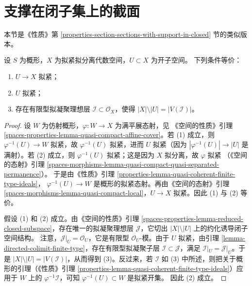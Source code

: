 \section{支撑在闭子集上的截面}
\label{section-sections-with-support-in-closed}

\noindent
本节是《性质》第
\ref{properties-section-sections-with-support-in-closed} 节的类似版本。

\begin{lemma}
\label{lemma-quasi-coherent-finite-type-ideals}
设 $S$ 为概形，$X$ 为拟紧拟分离代数空间，$U \subset X$ 为开子空间。
下列条件等价：
\begin{enumerate}
\item $U \to X$ 拟紧；
\item $U$ 拟紧；
\item 存在有限型拟凝聚理想层
$\mathcal{I} \subset \mathcal{O}_X$，使得
$|X| \setminus |U| = |V(\mathcal{I})|$。
\end{enumerate}
\end{lemma}

\begin{proof}
设 $W$ 为仿射概形，$\varphi : W \to X$ 为满平展态射，见
《空间的性质》引理
\ref{spaces-properties-lemma-quasi-compact-affine-cover}。若 (1) 成立，则
$\varphi^{-1}(U) \to W$ 拟紧，故 $\varphi^{-1}(U)$ 拟紧，进而 $U$
拟紧（因为 $|\varphi^{-1}(U)| \to |U|$ 是满射）。若 (2) 成立，则
$\varphi^{-1}(U)$ 拟紧；这是因为 $X$ 拟分离，故 $\varphi$ 拟紧
（《空间的态射》引理
\ref{spaces-morphisms-lemma-quasi-compact-quasi-separated-permanence}）。
于是由《性质》引理
\ref{properties-lemma-quasi-coherent-finite-type-ideals}，
$\varphi^{-1}(U) \to W$ 是概形的拟紧态射。再由《空间的态射》引理
\ref{spaces-morphisms-lemma-quasi-compact-local}，$U \to X$ 拟紧。因此
(1) 与 (2) 等价。

\medskip\noindent
假设 (1) 和 (2) 成立。由《空间的性质》引理
\ref{spaces-properties-lemma-reduced-closed-subspace}，存在唯一的拟凝聚理想层
$\mathcal{J}$，它切出 $|X| \setminus |U|$ 上的约化诱导闭子空间结构。
注意，$\mathcal{J}|_U = \mathcal{O}_U$，它是有限型
$\mathcal{O}_U$-模。由于 $U$ 拟紧，由引理
\ref{lemma-directed-colimit-finite-type}，存在有限型拟凝聚子层
$\mathcal{I} \subset \mathcal{J}$，满足
$\mathcal{I}|_U = \mathcal{J}|_U$。于是
$|X| \setminus |U| = |V(\mathcal{I})|$，从而得到 (3)。反过来，若
$\mathcal{I}$ 如 (3) 中所述，则把关于概形的引理（《性质》引理
\ref{properties-lemma-quasi-coherent-finite-type-ideals}）应用于 $W$ 上的
$\varphi^{-1}\mathcal{I}$，可知 $\varphi^{-1}(U) \subset W$ 是拟紧开集。
因此 (2) 成立。
\end{proof}

